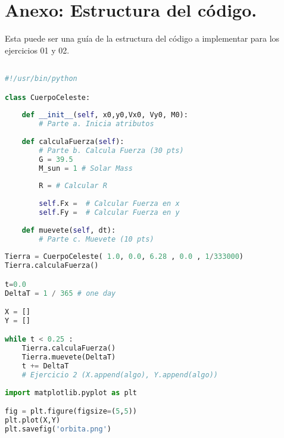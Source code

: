 \documentclass{article}
\begin{document}
\section*{Anexo: Estructura del código.}
Esta puede ser una guía de la estructura del código a implementar para los ejercicios 01 y 02.


\begin{lstlisting}[language=Python, caption=Estructura del ejercicio 2.]

#!/usr/bin/python

class CuerpoCeleste:
    
    def __init__(self, x0,y0,Vx0, Vy0, M0):
        # Parte a. Inicia atributos
        
    def calculaFuerza(self):
        # Parte b. Calcula Fuerza (30 pts)
        G = 39.5
        M_sun = 1 # Solar Mass
        
        R = # Calcular R
        
        self.Fx =  # Calcular Fuerza en x
        self.Fy =  # Calcular Fuerza en y
            
    def muevete(self, dt):
        # Parte c. Muevete (10 pts)
        
Tierra = CuerpoCeleste( 1.0, 0.0, 6.28 , 0.0 , 1/333000)
Tierra.calculaFuerza()

t=0.0
DeltaT = 1 / 365 # one day

X = []
Y = []

while t < 0.25 :
    Tierra.calculaFuerza()
    Tierra.muevete(DeltaT)
    t += DeltaT
    # Ejercicio 2 (X.append(algo), Y.append(algo))
    
import matplotlib.pyplot as plt

fig = plt.figure(figsize=(5,5))
plt.plot(X,Y)
plt.savefig('orbita.png')
\end{lstlisting}
\end{document}
